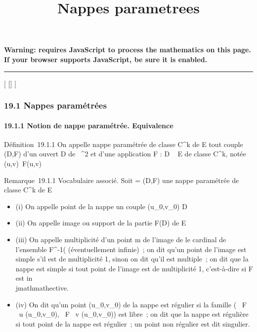 \documentclass[]{article}
\title{Nappes parametrees}
\author{}
\date{}
\begin{document}
\maketitle

\textbf{Warning: 
requires JavaScript to process the mathematics on this page.\\ If your
browser supports JavaScript, be sure it is enabled.}

\begin{center}\rule{3in}{0.4pt}\end{center}

{[}
{[}{]}
{[}

\subsubsection{19.1 Nappes paramétrées}

\paragraph{19.1.1 Notion de nappe paramétrée. Equivalence}

Définition~19.1.1 On appelle nappe paramétrée de classe C^k
de E tout couple (D,F) d'un ouvert D de ~^2 et d'une
application F : D \rightarrow~ E de classe C^k, notée
(u,v)\mapsto~F(u,v)

Remarque~19.1.1 Vocabulaire associé. Soit \Sigma = (D,F) une nappe paramétrée
de classe C^k de E

\begin{itemize}
\itemsep1pt\parskip0pt
\item
  (i) On appelle point de la nappe \Sigma un couple
  (u_0,v_0) \in D
\item
  (ii) On appelle image ou support de \Sigma la partie F(D) de E
\item
  (iii) On appelle multiplicité d'un point m de l'image de \Sigma le cardinal
  de l'ensemble F^-1(\m\)
  (éventuellement infinie)~; on dit qu'un point de l'image est simple
  s'il est de multiplicité 1, sinon on dit qu'il est multiple~; on dit
  que la nappe est simple si tout point de l'image est de multiplicité
  1, c'est-à-dire si F est in\\jmathmathective.
\item
  (iv) On dit qu'un point (u_0,v_0) de la nappe \Sigma est
  régulier si la famille ( \partial~F \over \partial~u
  (u_0,v_0), \partial~F \over \partial~v
  (u_0,v_0)) est libre~; on dit que la nappe est
  régulière si tout point de la nappe est régulier~; un point non
  régulier est dit singulier.
\end{itemize}
\end{document}
